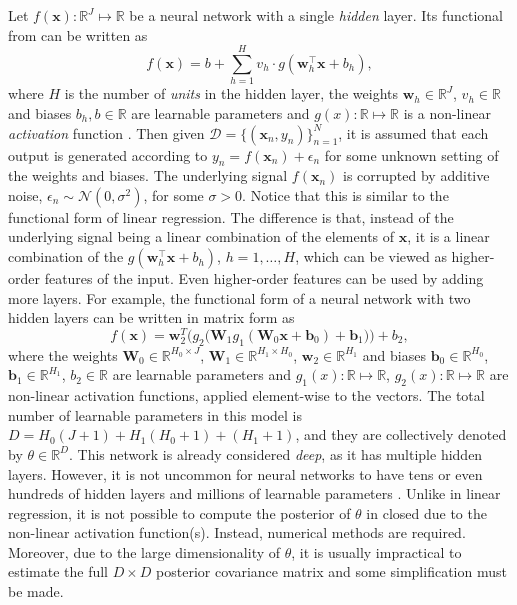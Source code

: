 \documentclass[msc,deptreport.inf]{infthesis} %
\newcommand{\matr}[1]{\mathbf{#1}}
\newcommand{\R}{\mathbb R}
\begin{document}
Let $f(\matr{x}): \R^J \mapsto \R$ be a neural network with a single \emph{hidden} layer. Its functional from can be written as
\begin{equation}
	f(\matr{x}) = b + \sum_{h=1}^H v_h \cdot g(\matr{w}_h^\intercal \matr{x} + b_h),
\end{equation} 
where $H$ is the number of \emph{units} in the hidden layer, the weights $\matr{w}_h \in \R^J$, $v_h \in \R$ and biases $b_h, b \in \R$ are learnable parameters and $g(x):\R \mapsto \R$ is a non-linear \emph{activation} function \cite{goodfellow2016}. Then given $\mathcal{D} = \{(\matr{x}_n, y_n)\}_{n=1}^{N}$, it is assumed that each output is generated according to $y_n = f(\matr{x}_n) + \epsilon_n$ for some unknown setting of the weights and biases. The underlying signal $f(\matr{x}_n)$ is corrupted by additive noise, $\epsilon_n \sim \mathcal{N}(0, \sigma^2)$, for some $\sigma > 0$. Notice that this is similar to the functional form of linear regression. The difference is that, instead of the underlying signal being a linear combination of the elements of $\matr{x}$, it is a linear combination of the $g(\matr{w}_h^\intercal \matr{x} + b_h)$, $h=1,\dots,H$, which can be viewed as higher-order features of the input.  Even higher-order features can be used by adding more layers. For example, the functional form of a neural network with two hidden layers can be written in matrix form as
\begin{equation}\label{eqn:multi_layer_nn}
	f(\matr{x}) = \matr{w}_2^T \Big(g_2\big(\matr{W}_1 g_1(\matr{W}_0 \matr{x} + \matr{b}_0) + \matr{b}_1 \big) \Big) + b_2,
\end{equation} 
where the weights $\matr{W}_0 \in \R^{H_0 \times J}$, $\matr{W}_1 \in \R^{H_1 \times H_0}$, $\matr{w}_2 \in \R^{H_1}$ and biases $\matr{b}_0 \in \R^{H_0}$, $\matr{b}_1 \in \R^{H_1}$, $b_2 \in \R$ are learnable parameters and $g_1(x):\R \mapsto \R$, $g_2(x):\R \mapsto \R$ are non-linear activation functions, applied element-wise to the vectors. The total number of learnable parameters in this model is $D=H_0(J + 1) + H_1(H_0 + 1) + (H_1 + 1)$, and they are collectively denoted by $\theta \in \R^D$. This network is already considered \emph{deep}, as it has multiple hidden layers. However, it is not uncommon for neural networks to have tens or even hundreds of hidden layers and millions of learnable parameters \cite{dai2021, shoeybi2019}. Unlike in linear regression, it is not possible to compute the posterior of $\theta$ in closed due to the non-linear activation function(s). Instead, numerical methods are required. Moreover, due to the large dimensionality of $\theta$, it is usually impractical to estimate the full $D \times D$ posterior covariance matrix and some simplification must be made.  
\end{document}
